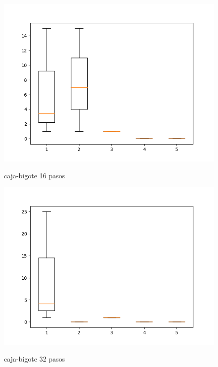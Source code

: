 \documentclass[a4paper, 11pt]{article}
\begin{document}
\begin{figure}[H]
  \centering      
  \caption{caja-bigote 16 pasos}  
  \includegraphics[scale=.7]{16_pasos.png}
  \label{cb16}
\end{figure}

\begin{figure}[H]
      \centering 
      \caption{caja-bigote 32 pasos}
      \includegraphics[scale=.7]{32_pasos.png} 
      \label{cb32}
\end{figure}
\end{document}
